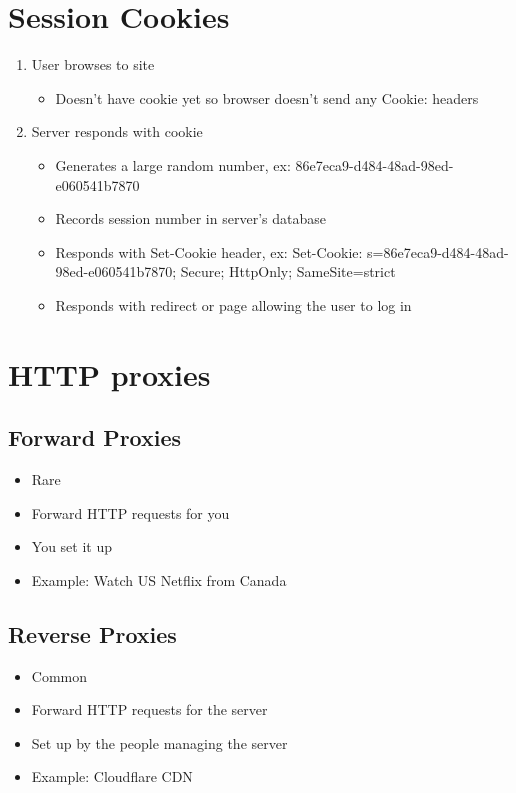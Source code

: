 \documentclass[../CMPUT-404-Notes.tex]{subfiles}
\begin{document}
\section{Session Cookies}
\begin{enumerate}
  \item User browses to site
  \begin{itemize}
    \item Doesn't have cookie yet so browser doesn't send any Cookie: headers
  \end{itemize}
  \item Server responds with cookie
  \begin{itemize}
    \item Generates a large random number, ex: 86e7eca9-d484-48ad-98ed-e060541b7870
    \item Records session number in server's database
    \item Responds with Set-Cookie header, ex: Set-Cookie: s=86e7eca9-d484-48ad-98ed-e060541b7870; Secure; HttpOnly; SameSite=strict
    \item Responds with redirect or page allowing the user to log in
  \end{itemize}
\end{enumerate}

\section{HTTP proxies}
\subsection{Forward Proxies}  
\begin{itemize}
  \item Rare
  \item Forward HTTP requests for you 
  \item You set it up 
  \item Example: Watch US Netflix from Canada
\end{itemize}

\subsection{Reverse Proxies}
\begin{itemize}
  \item Common
  \item Forward HTTP requests for the server
  \item Set up by the people managing the server
  \item Example: Cloudflare CDN
\end{itemize}
\end{document}
